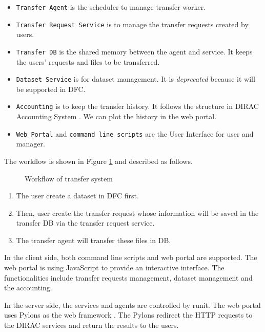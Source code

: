 \begin{itemize}
    \item {\tt Transfer Agent} is the scheduler to manage transfer worker.
    \item {\tt Transfer Request Service} is to manage the transfer requests
          created by users.
    \item {\tt Transfer DB} is the shared memory between the agent and 
          service. It keeps the users' requests and files to be transferred.
    \item {\tt Dataset Service} is for dataset management. It is 
          {\em deprecated} because it will be supported in DFC.
    \item {\tt Accounting} is to keep the transfer history.
          It follows the structure in DIRAC Accounting System
          \cite{bib:diracacct}.
          We can plot the history in the web portal.
    \item {\tt Web Portal} and {\tt command line scripts} are the 
          User Interface for user and manager.
\end{itemize}

The workflow is shown in Figure \ref{fig:workflow} and described as follows.
\begin{figure}
    
    \caption{Workflow of transfer system} \label{fig:workflow}
\end{figure}

\begin{enumerate}
\item The user create a dataset in DFC first.
\item Then, user create the transfer request
whose information will be saved in the transfer DB via
the transfer request service.
\item The transfer agent will transfer these files in DB.
\end{enumerate}

In the client side, both command line scripts and web portal are supported.
The web portal 
\cite{bib:webportal}
is using JavaScript to provide an interactive interface. The functionalities
include transfer requests management, dataset management and the 
accounting.

In the server side, the services and agents are controlled by runit.
The web portal uses Pylons as the web framework
\cite{bib:webportal}.
The Pylons redirect the HTTP requests to the DIRAC services and 
return the results to the users.
